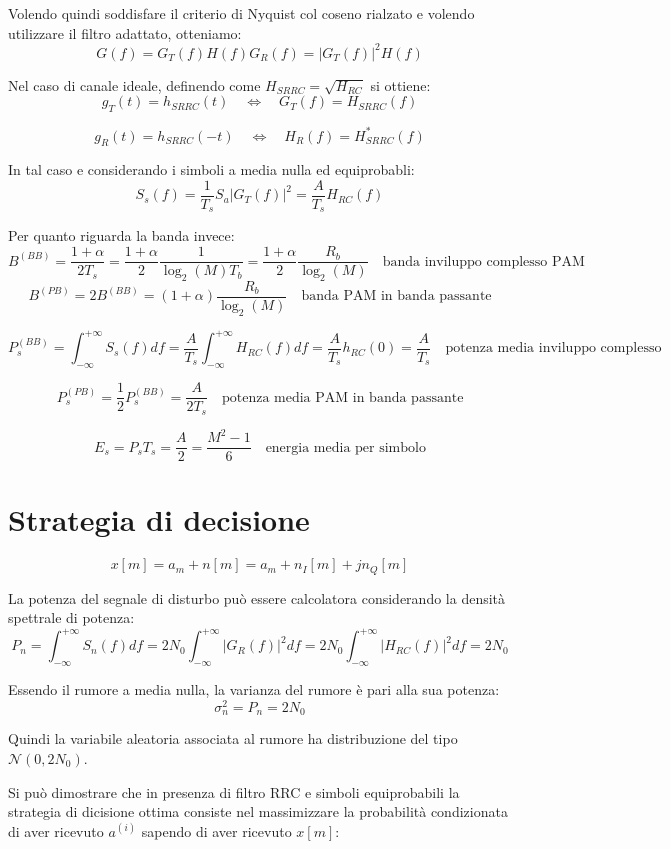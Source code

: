 Volendo quindi soddisfare il criterio di Nyquist col coseno rialzato e volendo utilizzare il filtro adattato, otteniamo:
\[
    G(f) = G_T(f) H(f) G_R(f) = |G_T(f)|^2 H(f)
\]

Nel caso di canale ideale, definendo come $H_{SRRC} = \sqrt{H_{RC}}$ si ottiene:
\[
    g_T(t) = h_{SRRC}(t) \quad \Longleftrightarrow \quad G_T(f) = H_{SRRC}(f)
\]

\[
    g_R(t) = h_{SRRC}(-t) \quad \Longleftrightarrow \quad H_R(f) = H_{SRRC}^*(f)
\]


In tal caso e considerando i simboli a media nulla ed equiprobabli:
\[
    S_s(f) = \frac{1}{T_s} S_a |G_T(f)|^2 = \frac{A}{T_s} H_{RC}(f)
\]


Per quanto riguarda la banda invece:
\[
    B^{(BB)} = \frac{1+\alpha}{2T_s} = \frac{1+\alpha}{2} \frac{1}{\log_2(M) T_b} = \frac{1+\alpha}{2} \frac{R_b}{\log_2(M)} \quad \text{banda inviluppo complesso PAM}
\]
\[
    B^{(PB)} = 2 B^{(BB)} = (1+\alpha) \frac{R_b}{\log_2(M)} \quad \text{banda PAM in banda passante}
\]

\[
    P_s^{(BB)} = \int_{-\infty}^{+\infty} S_s(f) df = \frac{A}{T_s} \int_{-\infty}^{+\infty} H_{RC}(f) df = \frac{A}{T_s} h_{RC}(0) = \frac{A}{T_s} \quad \text{potenza media inviluppo complesso}
\]

\[
    P_s^{(PB)} = \frac{1}{2} P_s^{(BB)} = \frac{A}{2T_s} \quad \text{potenza media PAM in banda passante}
\]

\[
    E_s = P_s T_s = \frac{A}{2} = \frac{M^2 - 1}{6} \quad \text{energia media per simbolo}
\]


\section*{Strategia di decisione}


\[
    x[m] = a_m + n[m] = a_m + n_I[m] + jn_Q[m]
\]

La potenza del segnale di disturbo può essere calcolatora considerando la densità spettrale di potenza:
\[
    P_n = \int_{-\infty}^{+\infty} S_n(f) df = 2N_0 \int_{-\infty}^{+\infty} |G_R(f)|^2 df = 2N_0 \int_{-\infty}^{+\infty} |H_{RC}(f)|^2 df = 2N_0
\]

Essendo il rumore a media nulla, la varianza del rumore è pari alla sua potenza:
\[
    \sigma_n^2 = P_n = 2N_0
\]

Quindi la variabile aleatoria associata al rumore ha distribuzione del tipo $\mathcal{N}(0, 2 N_0)$.

Si può dimostrare che in presenza di filtro RRC e simboli equiprobabili la strategia di dicisione ottima consiste nel massimizzare la probabilità condizionata di aver ricevuto $a^{(i)}$ sapendo di aver ricevuto $x[m]$:

